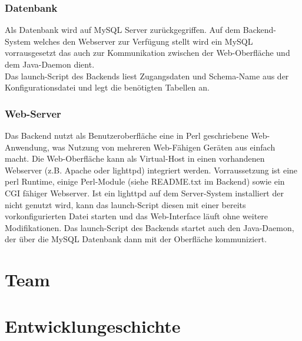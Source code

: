 \documentclass[12pt,a4paper]{article}
\begin{document}
\subsubsection{Datenbank}
Als Datenbank wird auf MySQL Server zurückgegriffen. Auf dem Backend-System welches den Webserver zur Verfügung stellt wird ein MySQL vorrausgesetzt das auch zur Kommunikation zwischen der Web-Oberfläche und dem Java-Daemon dient. \\
Das launch-Script des Backends liest Zugangsdaten und Schema-Name aus der Konfigurationsdatei und legt die benötigten Tabellen an.

\subsubsection{Web-Server}
Das Backend nutzt als Benutzeroberfläche eine in Perl geschriebene Web-Anwendung, was Nutzung von mehreren Web-Fähigen Geräten aus einfach macht. Die Web-Oberfläche kann als Virtual-Host in einen vorhandenen Webserver (z.B. Apache oder lighttpd) integriert werden. Vorraussetzung ist eine perl Runtime, einige Perl-Module (siehe README.txt im Backend) sowie ein CGI fähiger Webserver. Ist ein lighttpd auf dem Server-System installiert der nicht genutzt wird, kann das launch-Script diesen mit einer bereits vorkonfigurierten Datei starten und das Web-Interface läuft ohne weitere Modifikationen.
Das launch-Script des Backends startet auch den Java-Daemon, der über die MySQL Datenbank dann mit der Oberfläche kommuniziert.
		
\section{Team}

\section{Entwicklungeschichte}
\end{document}
